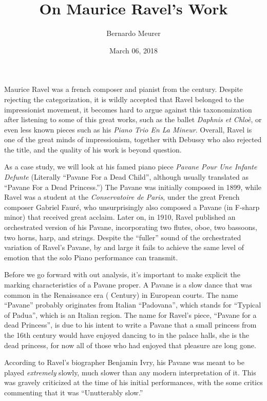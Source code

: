 \documentclass[titlepage,12pt]{article}
\title{On Maurice Ravel's Work}
\date{March 06, 2018}
\author{Bernardo Meurer}
\begin{document}
    \maketitle
    \newpage
    Maurice Ravel was a french composer and pianist from the  century. Despite rejecting the categorization, it is wildly accepted that Ravel belonged to the impressionist movement, it becomes hard to argue against this taxonomization after listening to some of this great works, such as the ballet \textit{Daphnis et Chloè}, or even less known pieces such as his \textit{Piano Trio En La Mineur}. Overall, Ravel is one of the great minds of impressionism, together with Debussy who also rejected the title, and the quality of his work is beyond question. 
    
    As a case study, we will look at his famed piano piece \textit{Pavane Pour Une Infante Defunte} (Literally ``Pavane For a Dead Child'', although usually translated as ``Pavane For a Dead Princess.'') The Pavane was initially composed in 1899, while Ravel was a student at the \textit{Conservatoire de Paris}, under the great French composer Gabriel Fauré, who unsurprisingly also composed a Pavane (in F-sharp minor) that received great acclaim. Later on, in 1910, Ravel published an orchestrated version of his Pavane, incorporating two flutes, oboe, two bassoons, two horns, harp, and strings. Despite the ``fuller'' sound of the orchestrated variation of Ravel's Pavane, by and large it fails to achieve the same level of emotion that the solo Piano performance can transmit.

    Before we go forward with out analysis, it's important to make explicit the marking characteristics of a Pavane proper. A Pavane is a slow dance that was common in the Renaissance era ( Century) in European courts. The name ``Pavane'' probably originates from Italian ``Padovana'', which stands for ``Typical of Padua'', which is an Italian region. The name for Ravel's piece, ``Pavane for a dead Princess'', is due to his intent to write a Pavane that a small princess from the 16th century would have enjoyed dancing to in the palace halls, she is the dead princess, for now all of those who had enjoyed that pleasure are long gone.

    According to Ravel's biographer Benjamin Ivry, his Pavane was meant to be played \emph{extremely} slowly, much slower than any modern interpretation of it. This was gravely criticized at the time of his initial performances, with the some critics commenting that it was ``Unutterably slow.''
\end{document}
